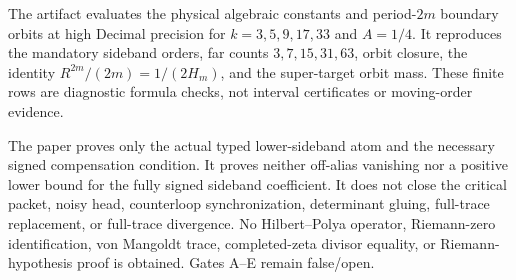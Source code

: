 \documentclass[11pt]{article}
\theoremstyle{remark}
\begin{document}
The artifact evaluates the physical algebraic constants and period-$2m$
boundary orbits at high Decimal precision for
$k=3,5,9,17,33$ and $A=1/4$.  It reproduces the mandatory sideband orders,
far counts $3,7,15,31,63$, orbit closure, the identity
$R^{2m}/(2m)=1/(2H_m)$, and the super-target orbit mass.  These finite rows
are diagnostic formula checks, not interval certificates or moving-order
evidence.

The paper proves only the actual typed lower-sideband atom and the necessary
signed compensation condition.  It proves neither off-alias vanishing nor a
positive lower bound for the fully signed sideband coefficient.  It does not
close the critical packet, noisy head, counterloop synchronization,
determinant gluing, full-trace replacement, or full-trace divergence.  No
Hilbert--Polya operator, Riemann-zero identification, von Mangoldt trace,
completed-zeta divisor equality, or Riemann-hypothesis proof is obtained.
Gates A--E remain false/open.



\end{document}
